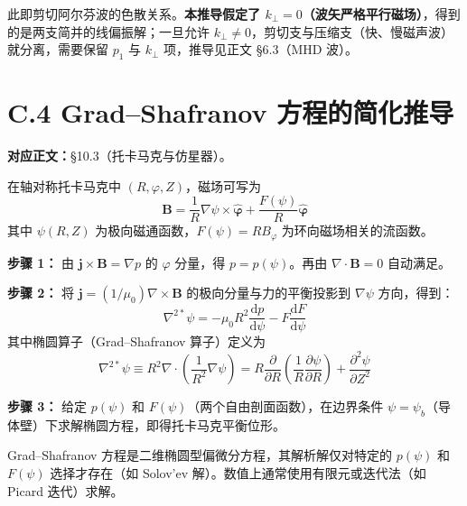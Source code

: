 \documentclass[12pt,a4paper,openany,oneside]{book}
\newcommand{\diff}{\mathrm{d}}
\newcommand{\vect}[1]{\bm{#1}}
\newcommand{\unitvec}[1]{\hat{\vect{#1}}}
\newcommand{\grad}{\nabla}
\newcommand{\curl}{\nabla\times}
\newcommand{\divg}{\nabla\cdot}
\begin{document}
此即剪切阿尔芬波的色散关系。\textbf{本推导假定了 $k_\perp=0$（波矢严格平行磁场）}，得到的是两支简并的线偏振解；一旦允许 $k_\perp\neq0$，剪切支与压缩支（快、慢磁声波）就分离，需要保留 $p_1$ 与 $k_\perp$ 项，推导见正文 \S 6.3（MHD 波）。


\section{C.4 Grad--Shafranov 方程的简化推导}
\label{sec:grad-shafranov}

\textbf{对应正文：}\S 10.3（托卡马克与仿星器）。

在轴对称托卡马克中 $(R,\varphi,Z)$，磁场可写为
\begin{equation}
\vect{B} = \frac{1}{R}\grad\psi\times\unitvec{\varphi} + \frac{F(\psi)}{R}\unitvec{\varphi}
\label{eq:ch10-grad-shafranov-b}
\end{equation}
其中 $\psi(R,Z)$ 为极向磁通函数，$F(\psi)=RB_\varphi$ 为环向磁场相关的流函数。

\textbf{步骤 1：} 由 $\vect{j}\times\vect{B}=\grad p$ 的 $\varphi$ 分量，得 $p=p(\psi)$。再由 $\divg\vect{B}=0$ 自动满足。

\textbf{步骤 2：} 将 $\vect{j}=(1/\mu_0)\curl\vect{B}$ 的极向分量与力的平衡投影到 $\grad\psi$ 方向，得到：
\begin{equation}
\nabla^{2*}\psi = -\mu_0 R^2 \frac{\diff p}{\diff\psi} - F\frac{\diff F}{\diff\psi}
\label{eq:ch10-grad-shafranov}
\end{equation}
其中椭圆算子（Grad--Shafranov 算子）定义为
\begin{equation}
\nabla^{2*}\psi \equiv R^2\divg\left(\frac{1}{R^2}\grad\psi\right) = R\frac{\partial }{\partial R}\!\left(\frac{1}{R}\frac{\partial \psi}{\partial R}\right) + \frac{\partial^2 \psi}{\partial Z^2}
\label{eq:ch10-grad-shafranov-operator}
\end{equation}

\textbf{步骤 3：} 给定 $p(\psi)$ 和 $F(\psi)$（两个自由剖面函数），在边界条件 $\psi=\psi_b$（导体壁）下求解椭圆方程，即得托卡马克平衡位形。

\begin{tip}
Grad--Shafranov 方程是二维椭圆型偏微分方程，其解析解仅对特定的 $p(\psi)$ 和 $F(\psi)$ 选择才存在（如 Solov'ev 解）。数值上通常使用有限元或迭代法（如 Picard 迭代）求解。
\end{tip}


\end{document}
